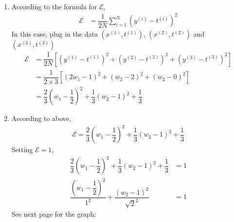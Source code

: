 \documentclass{article}
\begin{document}
\begin{enumerate}


\item %
According to the formula for $\mathcal{E}$, 
\begin{align*}
	\mathcal{E} &= \dfrac{1}{2N} \sum \limits_{i = 1}^{N} ( y^{(i)} - t^{(i)} )^2
\end{align*}
In this case, plug in the data $(x^{(1)}, t^{(1)})$, $(x^{(2)}, t^{(2)})$ and $(x^{(3)}, t^{(3)})$
\begin{align*}
	\mathcal{E} &= \dfrac{1}{2N} [ (y^{(1)} - t^{(1)})^2 + (y^{(2)} - t^{(2)})^2 + (y^{(3)} - t^{(3)})^2] \\
	&= \dfrac{1}{2 \times 3} [ (2w_1 - 1)^2 + (w_2 - 2)^2 + (w_2 - 0)^2] \\
	&= \dfrac{2}{3} (w_1 - \dfrac{1}{2})^2 + \dfrac{1}{3} (w_2 - 1)^2 + \dfrac{1}{3}
\end{align*}


\item %
According to above, 
\begin{align*}
	\mathcal{E} = \dfrac{2}{3} (w_1 - \dfrac{1}{2})^2 + \dfrac{1}{3} (w_2 - 1)^2 + \dfrac{1}{3}
\end{align*}
Setting $\mathcal{E} = 1$,
\begin{align*}
	\dfrac{2}{3} (w_1 - \dfrac{1}{2})^2 + \dfrac{1}{3} (w_2 - 1)^2 + \dfrac{1}{3} &= 1 \\
	\dfrac{(w_1 - \dfrac{1}{2})^2}{1^2} + \dfrac{(w_2 - 1)^2}{\sqrt{2}^2} &= 1
\end{align*}
See next page for the graph:


\end{enumerate}
\end{document}
